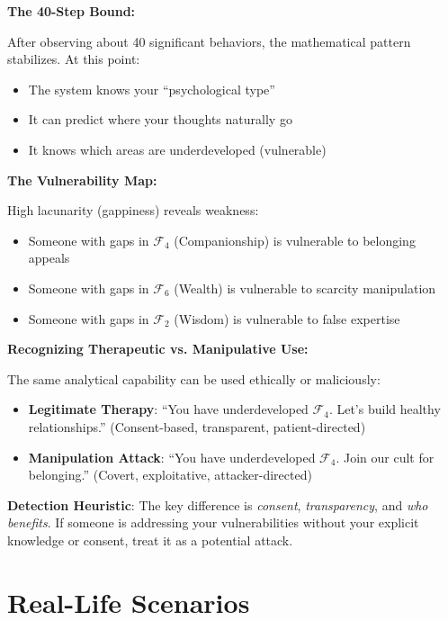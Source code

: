 \documentclass[11pt,twoside]{book}
\theoremstyle{definition}
\theoremstyle{plain}
\theoremstyle{remark}
\newcommand{\Foundations}{\mathcal{F}}
\begin{document}
\begin{tcolorbox}[colback=green!5!white,colframe=green!65!black,title=\textbf{Plain English: The Psychological X-Ray},breakable]
\textbf{The 40-Step Bound:}

After observing about 40 significant behaviors, the mathematical pattern stabilizes. At this point:
\begin{itemize}
    \item The system knows your ``psychological type''
    \item It can predict where your thoughts naturally go
    \item It knows which areas are underdeveloped (vulnerable)
\end{itemize}

\textbf{The Vulnerability Map:}

High lacunarity (gappiness) reveals weakness:
\begin{itemize}
    \item Someone with gaps in $\Foundations_4$ (Companionship) is vulnerable to belonging appeals
    \item Someone with gaps in $\Foundations_6$ (Wealth) is vulnerable to scarcity manipulation
    \item Someone with gaps in $\Foundations_2$ (Wisdom) is vulnerable to false expertise
\end{itemize}

\textbf{Recognizing Therapeutic vs. Manipulative Use:}

The same analytical capability can be used ethically or maliciously:
\begin{itemize}
    \item \textbf{Legitimate Therapy}: ``You have underdeveloped $\Foundations_4$. Let's build healthy relationships.'' (Consent-based, transparent, patient-directed)
    \item \textbf{Manipulation Attack}: ``You have underdeveloped $\Foundations_4$. Join our cult for belonging.'' (Covert, exploitative, attacker-directed)
\end{itemize}

\textbf{Detection Heuristic}: The key difference is \emph{consent}, \emph{transparency}, and \emph{who benefits}. If someone is addressing your vulnerabilities without your explicit knowledge or consent, treat it as a potential attack.

\end{tcolorbox}

\chapter{Real-Life Scenarios}
\end{document}
